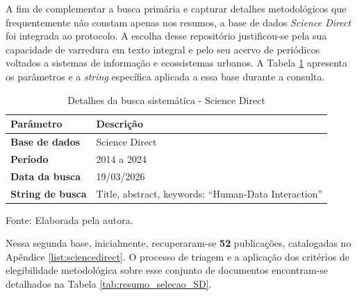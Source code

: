 \documentclass[
	12pt,				%
	oneside,			%
	a4paper,			%
	english,			%
	brazil				%
	]{abntex2ppgsi}
\begin{document}
    A fim de complementar a busca primária e capturar detalhes metodológicos que frequentemente não constam apenas nos resumos, a base de dados \textit{Science Direct} foi integrada ao protocolo. A escolha desse repositório justificou-se pela sua capacidade de varredura em texto integral e pelo seu acervo de periódicos voltados a sistemas de informação e ecossistemas urbanos. A Tabela \ref{tab:detalhes_busca_sd} apresenta os parâmetros e a \textit{string} específica aplicada a essa base durante a consulta.

\begin{table}[htbp]
\centering
\caption{Detalhes da busca sistemática - Science Direct}
\label{tab:detalhes_busca_sd}
\renewcommand{\arraystretch}{1.4} 
\begin{tabular}{@{} >{\bfseries}p{3.5cm} p{11cm} @{}}
\toprule
Parâmetro & Descrição \\
\midrule
Base de dados & Science Direct \\
Período & 2014 a 2024 \\
Data da busca & 19/03/2026 \\
String de busca & Title, abstract, keywords: ``Human-Data Interaction'' \\
\bottomrule
\end{tabular}

\vspace{0.2cm} 
{\small Fonte: Elaborada pela autora.}
\end{table}

    Nessa segunda base, inicialmente, recuperaram-se \textbf{52} publicações, catalogadas no Apêndice \ref{list:sciencedirect}. O processo de triagem e a aplicação dos critérios de elegibilidade metodológica sobre esse conjunto de documentos encontram-se detalhados na Tabela \ref{tab:resumo_selecao_SD}.
\end{document}
